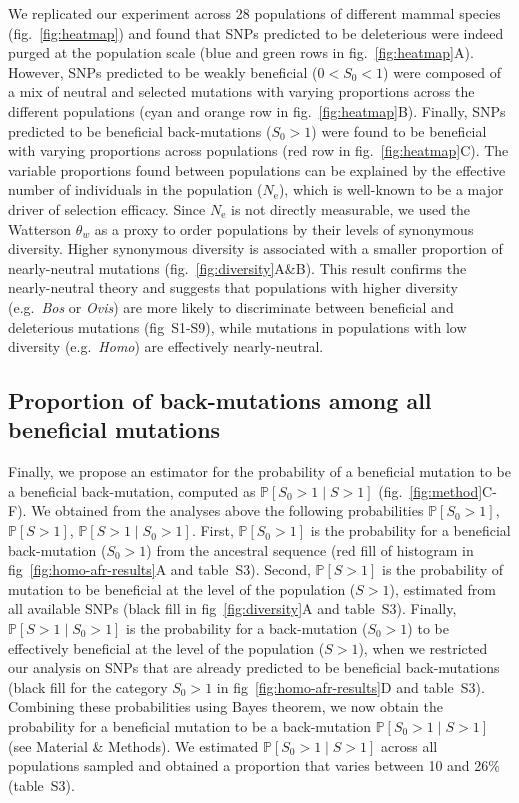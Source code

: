 \documentclass{article}
\newcommand{\Ne}{N_{\textrm{e}}}
\newcommand{\Sphy}{S_{0}}
\newcommand{\divWeakAdv}{0 < \Sphy < 1}
\newcommand{\divAdv}{ \Sphy > 1}
\newcommand{\given}{\mid}
\newcommand{\Spop}{S}
\begin{document}
    We replicated our experiment across 28 populations of different mammal species (fig.~\ref{fig:heatmap}) and found that SNPs predicted to be deleterious were indeed purged at the population scale (blue and green rows in fig.~\ref{fig:heatmap}A).
    However, SNPs predicted to be weakly beneficial ($\divWeakAdv$) were composed of a mix of neutral and selected mutations with varying proportions across the different populations (cyan and orange row in fig.~\ref{fig:heatmap}B).
    Finally, SNPs predicted to be beneficial back-mutations ($\divAdv$) were found to be beneficial with varying proportions across populations (red row in fig.~\ref{fig:heatmap}C).
    The variable proportions found between populations can be explained by the effective number of individuals in the population ($\Ne$), which is well-known to be a major driver of selection efficacy.
    Since $\Ne$ is not directly measurable, we used the Watterson $\theta_w$ as a proxy to order populations by their levels of synonymous diversity.
    Higher synonymous diversity is associated with a smaller proportion of nearly-neutral mutations (fig.~\ref{fig:diversity}A\&B).
    This result confirms the nearly-neutral theory and suggests that populations with higher diversity (e.g.~\textit{Bos} or \textit{Ovis}) are more likely to discriminate between beneficial and deleterious mutations (fig~S1-S9), while mutations in populations with low diversity (e.g.~\textit{Homo}) are effectively nearly-neutral.

    \subsection*{Proportion of back-mutations among all beneficial mutations}

    Finally, we propose an estimator for the probability of a beneficial mutation to be a beneficial back-mutation, computed as $\mathbb{P} [ \Sphy > 1  \given  \Spop > 1]$ (fig.~\ref{fig:method}C-F).
    We obtained from the analyses above the following probabilities $\mathbb{P} [ \Sphy > 1 ]$, $\mathbb{P} [ \Spop > 1 ]$, $\mathbb{P} [ \Spop > 1  \given  \Sphy > 1]$.
    First, $\mathbb{P} [ \Sphy > 1 ]$ is the probability for a beneficial back-mutation ($\Sphy > 1$) from the ancestral sequence (red fill of histogram in fig~\ref{fig:homo-afr-results}A and table~S3).
    Second, $\mathbb{P} [ \Spop > 1 ]$ is the probability of mutation to be beneficial at the level of the population ($\Spop > 1$), estimated from all available SNPs (black fill in fig~\ref{fig:diversity}A and table~S3).
    Finally, $\mathbb{P} [ \Spop > 1  \given  \Sphy > 1]$ is the probability for a back-mutation ($\Sphy > 1$) to be effectively beneficial at the level of the population ($\Spop > 1$), when we restricted our analysis on SNPs that are already predicted to be beneficial back-mutations (black fill for the category $\Sphy > 1$ in fig~\ref{fig:homo-afr-results}D and table~S3).
    Combining these probabilities using Bayes theorem, we now obtain the probability for a beneficial mutation to be a back-mutation $\mathbb{P} [ \Sphy > 1  \given  \Spop > 1]$ (see Material \& Methods).
    We estimated $\mathbb{P} [ \Sphy > 1  \given  \Spop > 1]$ across all populations sampled and obtained a proportion that varies between 10 and 26\% (table~S3).
\end{document}

